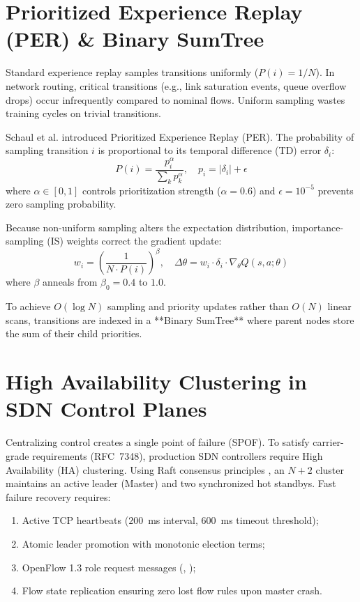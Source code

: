\documentclass[12pt,a4paper,oneside]{report}
\newcommand{\code}[1]{\texttt{\detokenize{#1}}}
\begin{document}
\section{Prioritized Experience Replay (PER) \& Binary SumTree}
Standard experience replay samples transitions uniformly ($P(i) = 1 / N$). In network routing, critical transitions (e.g., link saturation events, queue overflow drops) occur infrequently compared to nominal flows. Uniform sampling wastes training cycles on trivial transitions.

Schaul et al. \cite{schaul2015prioritized} introduced Prioritized Experience Replay (PER). The probability of sampling transition $i$ is proportional to its temporal difference (TD) error $\delta_i$:
\begin{equation}
P(i) = \frac{p_i^\alpha}{\sum_k p_k^\alpha}, \quad p_i = |\delta_i| + \epsilon
\end{equation}
where $\alpha \in [0, 1]$ controls prioritization strength ($\alpha = 0.6$) and $\epsilon = 10^{-5}$ prevents zero sampling probability.

Because non-uniform sampling alters the expectation distribution, importance-sampling (IS) weights correct the gradient update:
\begin{equation}
w_i = \left( \frac{1}{N \cdot P(i)} \right)^\beta, \quad \Delta \theta = w_i \cdot \delta_i \cdot \nabla_\theta Q(s, a; \theta)
\end{equation}
where $\beta$ anneals from $\beta_0 = 0.4$ to $1.0$.

To achieve $O(\log N)$ sampling and priority updates rather than $O(N)$ linear scans, transitions are indexed in a **Binary SumTree** where parent nodes store the sum of their child priorities.

\section{High Availability Clustering in SDN Control Planes}
Centralizing control creates a single point of failure (SPOF). To satisfy carrier-grade requirements (RFC~7348), production SDN controllers require High Availability (HA) clustering.
Using Raft consensus principles \cite{ongaro2014search}, an $N+2$ cluster maintains an active leader (Master) and two synchronized hot standbys. Fast failure recovery requires:
\begin{enumerate}
  \item Active TCP heartbeats ($200$~ms interval, $600$~ms timeout threshold);
  \item Atomic leader promotion with monotonic election terms;
  \item OpenFlow 1.3 role request messages (\code{OFPCR_ROLE_MASTER}, \code{OFPCR_ROLE_SLAVE});
  \item Flow state replication ensuring zero lost flow rules upon master crash.
\end{enumerate}
\end{document}
